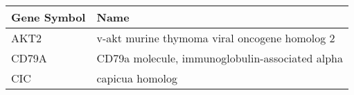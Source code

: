 \begin{tabular}{ll}
\toprule
Gene Symbol &                                            Name \\
\midrule
       AKT2 &   v-akt murine thymoma viral oncogene homolog 2 \\
      CD79A & CD79a molecule, immunoglobulin-associated alpha \\
        CIC &                                 capicua homolog \\
\bottomrule
\end{tabular}
